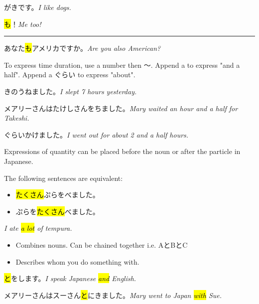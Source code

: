     {
    がきです。\textit{I like dogs.}
    
    \hl{も}！\textit{Me too!}
    
    \rule{40mm}{1pt}
    
    あなた\hl{も}アメリカですか。\textit{Are you also American?}
    }

    {
    To express time duration, use a number then 〜.
    Append a  to express "and a half".
    Append a ぐらい to express "about".
    
    きのうねました。\textit{I slept 7 hours yesterday.}
    
    メアリーさんはたけしさんをちました。\textit{Mary waited an hour and a half for Takeshi.}
    
    ぐらいかけました。\textit{I went out for about 2 and a half hours.}
    }
    
    {
    Expressions of quantity can be placed before the noun or after the particle in Japanese.
    
    The following sentences are equivalent:
    \begin{itemize}
        \item \hl{たくさん}ぷらをべました。
        \item {}ぷらを\hl{たくさん}べました。
    \end{itemize}
    \textit{I ate \hl{a lot} of tempura.}
    }

    {
    \begin{itemize}
        \item Combines nouns. Can be chained together i.e. AとBとC
        \item Describes whom you do something with.
    \end{itemize}
    
    \hl{と}をします。\textit{I speak Japanese \hl{and} English.}
    
    メアリーさんはスーさん\hl{と}にきました。\textit{Mary went to Japan \hl{with} Sue.}
    }